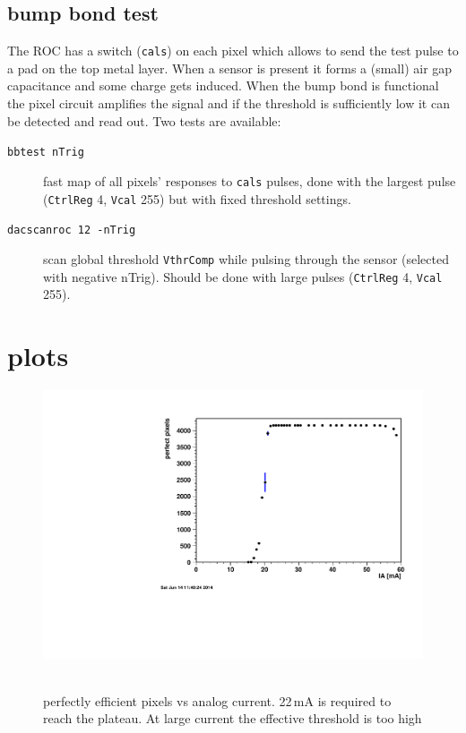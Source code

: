 \documentclass[english]{article}
\begin{document}
\subsection{bump bond test}

The ROC has a switch (\texttt{cals}) on each pixel which allows to
send the test pulse to a pad on the top metal layer. When a sensor
is present it forms a (small) air gap capacitance and some charge
gets induced. When the bump bond is functional the pixel circuit amplifies
the signal and if the threshold is sufficiently low it can be detected
and read out. Two tests are available: 
\begin{description}
\item [\texttt{bbtest\ nTrig}] fast map of all pixels' responses
to \texttt{cals} pulses, done with the largest pulse (\texttt{CtrlReg}
4, \texttt{Vcal} 255) but with fixed threshold settings. 
\item [\texttt{dacscanroc\ 12\ -nTrig}] scan global threshold
\texttt{VthrComp} while pulsing through the sensor (selected with
negative nTrig). Should be done with large pulses (\texttt{CtrlReg}
4, \texttt{Vcal} 255). 
\end{description}
\clearpage{}


\section{plots}

%
\begin{figure}
\hfill{}\includegraphics[scale=0.5]{c405-perfect-va-Ia}\hfill{}~\protect\caption{perfectly efficient pixels vs analog current. 22\,mA is required
to reach the plateau. At large current the effective threshold is
too high}
%
\end{figure}
\end{document}
